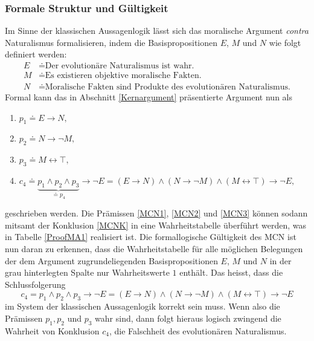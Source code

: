 \documentclass[a4paper,11pt]{article}
\numberwithin{equation}{section}
\begin{document}
\subsubsection{Formale Struktur und Gültigkeit}\label{formstruktgueltmcn}
Im Sinne der klassischen Aussagenlogik lässt sich das moralische Argument \textit{contra} Naturalismus formalisieren, indem die Basispropositionen $E$, $M$ und $N$ wie folgt definiert werden:
\begin{align*}
E &\doteq \text{Der evolutionäre Naturalismus ist wahr.} \\
M &\doteq \text{Es existieren objektive moralische Fakten.} \\
N &\doteq \text{Moralische Fakten sind Produkte des evolutionären Naturalismus.}
\end{align*}
Formal kann das in Abschnitt \ref{Kernargument} präsentierte Argument nun als  \begin{enumerate}
\item $p_1 \doteq E \rightarrow N,$ \label{MCN1}
\item $p_2 \doteq N \rightarrow \neg M,$ \label{MCN2}
\item $p_3 \doteq M \leftrightarrow \top,$ \label{MCN3}
\item $c_4 \doteq \underbrace{p_1 \land p_2 \land p_3}_{\doteq p_4} \rightarrow \neg E = (E \rightarrow N) \land (N \rightarrow \neg M) \land (M \leftrightarrow \top) \rightarrow \neg E,$\label{MCNK}
\end{enumerate} geschrieben werden. Die Prämissen \ref{MCN1}, \ref{MCN2} und \ref{MCN3} können sodann mitsamt der Konklusion \ref{MCNK} in eine Wahrheitstabelle überführt werden, was in Tabelle \ref{ProofMA1} realisiert ist. Die formallogische Gültigkeit des MCN ist nun daran zu erkennen, dass die Wahrheitstabelle für alle möglichen Belegungen der dem Argument zugrundeliegenden Basispropositionen $E$, $M$ und $N$ in der grau hinterlegten Spalte nur Wahrheitswerte $1$ enthält. Das heisst, dass die Schlussfolgerung \begin{equation}
c_4 = p_1 \land p_2 \land p_3 \rightarrow \neg E = (E \rightarrow N) \land (N \rightarrow \neg M) \land (M \leftrightarrow \top) \rightarrow \neg E
\end{equation} im System der klassischen Aussagenlogik korrekt sein muss. Wenn also die Prämissen $p_1, p_2$ und $p_3$ wahr sind, dann folgt hieraus logisch zwingend die Wahrheit von Konklusion $c_4$, die Falschheit des evolutionären Naturalismus.

\end{document}
